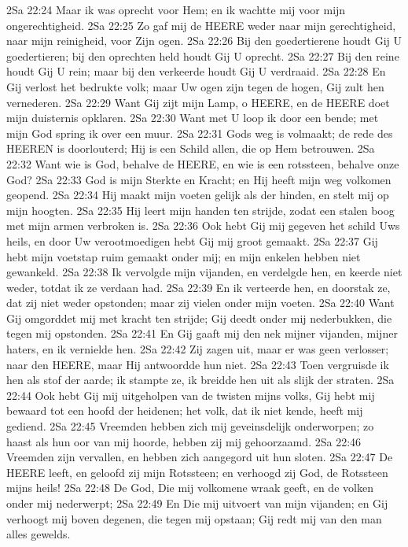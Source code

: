 2Sa 22:24  Maar ik was oprecht voor Hem; en ik wachtte mij voor mijn ongerechtigheid.
2Sa 22:25  Zo gaf mij de HEERE weder naar mijn gerechtigheid, naar mijn reinigheid, voor Zijn ogen.
2Sa 22:26  Bij den goedertierene houdt Gij U goedertieren; bij den oprechten held houdt Gij U oprecht.
2Sa 22:27  Bij den reine houdt Gij U rein; maar bij den verkeerde houdt Gij U verdraaid.
2Sa 22:28  En Gij verlost het bedrukte volk; maar Uw ogen zijn tegen de hogen, Gij zult hen vernederen.
2Sa 22:29  Want Gij zijt mijn Lamp, o HEERE, en de HEERE doet mijn duisternis opklaren.
2Sa 22:30  Want met U loop ik door een bende; met mijn God spring ik over een muur.
2Sa 22:31  Gods weg is volmaakt; de rede des HEEREN is doorlouterd; Hij is een Schild allen, die op Hem betrouwen.
2Sa 22:32  Want wie is God, behalve de HEERE, en wie is een rotssteen, behalve onze God?
2Sa 22:33  God is mijn Sterkte en Kracht; en Hij heeft mijn weg volkomen geopend.
2Sa 22:34  Hij maakt mijn voeten gelijk als der hinden, en stelt mij op mijn hoogten.
2Sa 22:35  Hij leert mijn handen ten strijde, zodat een stalen boog met mijn armen verbroken is.
2Sa 22:36  Ook hebt Gij mij gegeven het schild Uws heils, en door Uw verootmoedigen hebt Gij mij groot gemaakt.
2Sa 22:37  Gij hebt mijn voetstap ruim gemaakt onder mij; en mijn enkelen hebben niet gewankeld.
2Sa 22:38  Ik vervolgde mijn vijanden, en verdelgde hen, en keerde niet weder, totdat ik ze verdaan had.
2Sa 22:39  En ik verteerde hen, en doorstak ze, dat zij niet weder opstonden; maar zij vielen onder mijn voeten.
2Sa 22:40  Want Gij omgorddet mij met kracht ten strijde; Gij deedt onder mij nederbukken, die tegen mij opstonden.
2Sa 22:41  En Gij gaaft mij den nek mijner vijanden, mijner haters, en ik vernielde hen.
2Sa 22:42  Zij zagen uit, maar er was geen verlosser; naar den HEERE, maar Hij antwoordde hun niet.
2Sa 22:43  Toen vergruisde ik hen als stof der aarde; ik stampte ze, ik breidde hen uit als slijk der straten.
2Sa 22:44  Ook hebt Gij mij uitgeholpen van de twisten mijns volks, Gij hebt mij bewaard tot een hoofd der heidenen; het volk, dat ik niet kende, heeft mij gediend.
2Sa 22:45  Vreemden hebben zich mij geveinsdelijk onderworpen; zo haast als hun oor van mij hoorde, hebben zij mij gehoorzaamd.
2Sa 22:46  Vreemden zijn vervallen, en hebben zich aangegord uit hun sloten.
2Sa 22:47  De HEERE leeft, en geloofd zij mijn Rotssteen; en verhoogd zij God, de Rotssteen mijns heils!
2Sa 22:48  De God, Die mij volkomene wraak geeft, en de volken onder mij nederwerpt;
2Sa 22:49  En Die mij uitvoert van mijn vijanden; en Gij verhoogt mij boven degenen, die tegen mij opstaan; Gij redt mij van den man alles gewelds.
